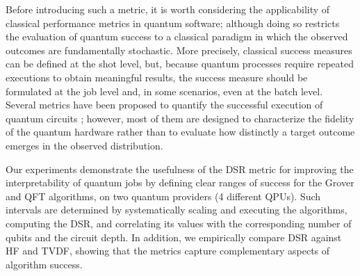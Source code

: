 \documentclass{article}
\begin{document}
Before introducing such a metric, it is worth considering the applicability of classical performance metrics in quantum software; although doing so restricts the evaluation of quantum success to a classical paradigm in which the observed outcomes are fundamentally stochastic. More precisely, classical success measures can be defined at the shot level, but, because quantum processes require repeated executions to obtain meaningful results, the success measure should be formulated at the job level and, in some scenarios, even at the batch level. Several metrics have been proposed to quantify the successful execution of quantum circuits \cite{mohapatraBenchmarkingFidelityMetrics_2025}; however, most of them are designed to characterize the fidelity of the quantum hardware rather than to evaluate how distinctly a target outcome emerges in the observed distribution.


Our experiments demonstrate the usefulness of the DSR metric for improving the interpretability of quantum jobs by defining clear ranges of success for the Grover and QFT algorithms, on two quantum providers (4 different QPUs). Such intervals are determined by systematically scaling and executing the algorithms, computing the DSR, and correlating its values with the corresponding number of qubits and the circuit depth. In addition, we empirically compare DSR against HF and TVDF, showing that the metrics capture complementary aspects of algorithm success.
\end{document}
